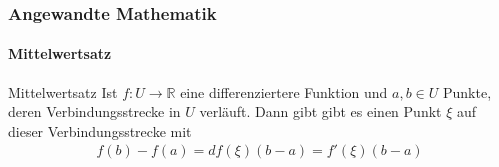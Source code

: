 \documentclass{beamer}
\begin{document}



 \begin{frame}
    \frametitle{Angewandte Mathematik}
\framesubtitle{Mittelwertsatz}
    \begin{block}{Mittelwertsatz}
Ist $f: U \to \mathbb{R}$ eine differenziertere Funktion und $a,b \in U$ Punkte, deren Verbindungsstrecke in $U$ verläuft. Dann gibt gibt es einen Punkt $\xi$ auf dieser Verbindungsstrecke mit
\begin{align*}
f(b) - f(a) = df(\xi)(b-a) = f'(\xi) (b-a)
\end{align*}
\end{block}
 \end{frame}
\end{document}
